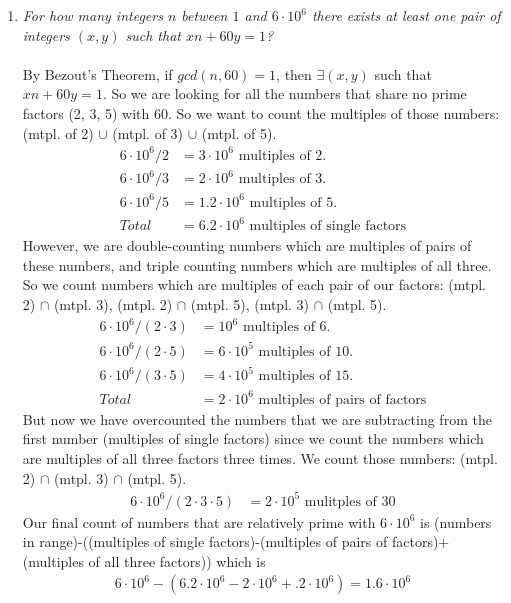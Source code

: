 \documentclass[12pt]{article}
\begin{document}
\begin{enumerate}
\item \emph{For how many integers $n$ between $1$ and $6 \cdot 10^6$ there exists at least one pair of integers $(x, y)$ such that $xn + 60y = 1$?} \\
\\
By Bezout's Theorem, if $gcd(n, 60) = 1$, then $\exists(x, y)$ such that $xn + 60y = 1$. So we are looking for all the numbers that share no prime factors (2, 3, 5) with 60. So we want to count the multiples of those numbers: (mtpl. of 2) $\cup$ (mtpl. of 3) $\cup$ (mtpl. of 5).
\begin{align*}
6 \cdot 10^6 / 2 &= 3 \cdot 10^6 \text{ multiples of 2.}\\
6 \cdot 10^6 / 3 &= 2 \cdot 10^6 \text{ multiples of 3.}\\
6 \cdot 10^6 / 5 &= 1.2 \cdot 10^6 \text{ multiples of 5.}\\
Total &= 6.2 \cdot 10^6 \text{ multiples of single factors}
\end{align*}
However, we are double-counting numbers which are multiples of pairs of these numbers, and triple counting numbers which are multiples of all three. So we count numbers which are multiples of each pair of our factors: (mtpl. 2) $\cap$ (mtpl. 3), (mtpl. 2) $\cap$ (mtpl. 5), (mtpl. 3) $\cap$ (mtpl. 5).
\begin{align*}
6 \cdot 10^6 / (2 \cdot 3) &= 10^6 \text{ multiples of 6.}\\
6 \cdot 10^6 / (2 \cdot 5) &= 6 \cdot 10^5 \text{ multiples of 10.}\\
6 \cdot 10^6 / (3 \cdot 5) &= 4 \cdot 10^5 \text{ multiples of 15.}\\
Total &=2 \cdot 10^6 \text{ multiples of pairs of factors}
\end{align*}
But now we have overcounted the numbers that we are subtracting from the first number (multiples of single factors) since we count the numbers which are multiples of all three factors three times. We count those numbers: (mtpl. 2) $\cap$ (mtpl. 3) $\cap$ (mtpl. 5).
\begin{align*}
6 \cdot 10^6 / (2 \cdot 3 \cdot 5) &= 2 \cdot 10^5 \text{ mulitples of 30}
\end{align*}
Our final count of numbers that are relatively prime with $6\cdot 10^6$ is (numbers in range)-((multiples of single factors)-(multiples of pairs of factors)+(multiples of all three factors)) which is
\begin{align*}
6 \cdot 10^6 - (6.2\cdot 10^6 - 2\cdot 10^6 + .2 \cdot 10^6) = 1.6 \cdot 10^6 
\end{align*}
\end{enumerate}
\end{document}
